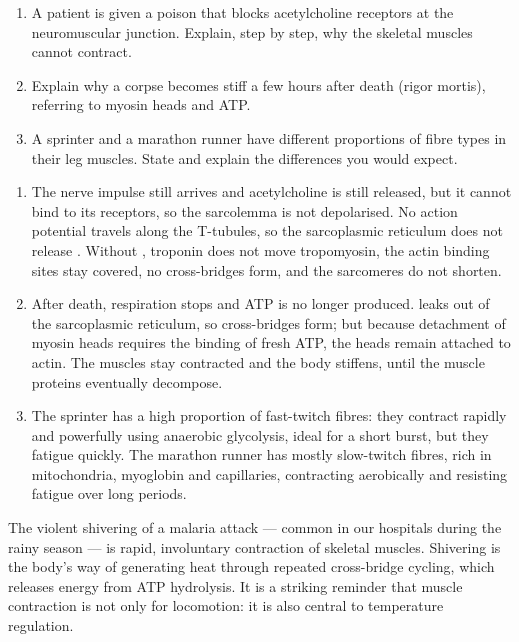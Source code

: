 \documentclass[11pt]{article}
\begin{document}
\begin{exercice}
\begin{enumerate}
\item A patient is given a poison that blocks acetylcholine receptors at the neuromuscular junction. Explain, step by step, why the skeletal muscles cannot contract.
\item Explain why a corpse becomes stiff a few hours after death (rigor mortis), referring to myosin heads and ATP.
\item A sprinter and a marathon runner have different proportions of fibre types in their leg muscles. State and explain the differences you would expect.
\end{enumerate}
\end{exercice}

\begin{corrige}[Exercise 1]
\begin{enumerate}
\item The nerve impulse still arrives and acetylcholine is still released, but it cannot bind to its receptors, so the sarcolemma is not depolarised. No action potential travels along the T-tubules, so the sarcoplasmic reticulum does not release . Without , troponin does not move tropomyosin, the actin binding sites stay covered, no cross-bridges form, and the sarcomeres do not shorten.
\item After death, respiration stops and ATP is no longer produced.  leaks out of the sarcoplasmic reticulum, so cross-bridges form; but because detachment of myosin heads requires the binding of fresh ATP, the heads remain attached to actin. The muscles stay contracted and the body stiffens, until the muscle proteins eventually decompose.
\item The sprinter has a high proportion of fast-twitch fibres: they contract rapidly and powerfully using anaerobic glycolysis, ideal for a short burst, but they fatigue quickly. The marathon runner has mostly slow-twitch fibres, rich in mitochondria, myoglobin and capillaries, contracting aerobically and resisting fatigue over long periods.
\end{enumerate}
\end{corrige}

\begin{savaistu}
The violent shivering of a malaria attack — common in our hospitals during the rainy season — is rapid, involuntary contraction of skeletal muscles. Shivering is the body's way of generating heat through repeated cross-bridge cycling, which releases energy from ATP hydrolysis. It is a striking reminder that muscle contraction is not only for locomotion: it is also central to temperature regulation.
\end{savaistu}
\end{document}

